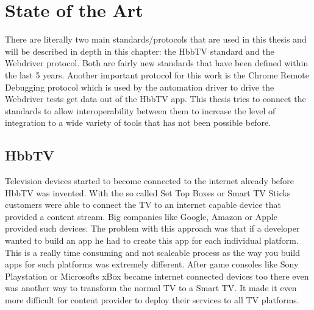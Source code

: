 %
%

\chapter{State of the Art\label{cha:state_of_the_art}}

There are literally two main standards/protocols that are used in this thesis and will be described in
depth in this chapter: the HbbTV standard and the Webdriver protocol. Both are fairly new standards that
have been defined within the last 5 years. Another important protocol for this work is the Chrome Remote
Debugging protocol which is used by the automation driver to drive the Webdriver tests get data out of
the HbbTV app. This thesis tries to connect the standards to allow interoperability between them to
increase the level of integration to a wide variety of tools that has not been possible before.

\section{HbbTV\label{sec:hbbtv}}


Television devices started to become connected to the internet already before HbbTV was invented. With
the so called Set Top Boxes or Smart TV Sticks customers were able to connect the TV to an internet
capable device that provided a content stream. Big companies like Google, Amazon or Apple provided such
devices. The problem with this approach was that if a developer wanted to build an app he had to create
this app for each individual platform. This is a really time consuming and not scaleable process as
the way you build apps for such platforms was extremely different. After game consoles like Sony Playstation
or Microsofts xBox became internet connected devices too there even was another way to transform
the normal TV to a Smart TV. It made it even more difficult for content provider to deploy their services
to all TV platforms.

